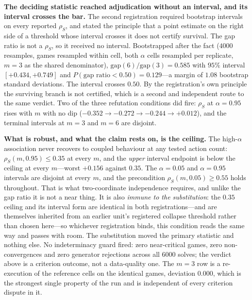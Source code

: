 \noindent\textbf{The deciding statistic reached adjudication without an interval, and its
interval crosses the bar.} The second registration required bootstrap intervals on every
reported $\rho_S$, and stated the principle that a point estimate on the right side of a
threshold whose interval crosses it does not certify survival. The gap ratio is not a
$\rho_S$, so it received no interval. Bootstrapped after the fact ($4000$ resamples,
games resampled within cell, both $\alpha$ cells resampled per replicate, $m=3$ as the
shared denominator), $\mathrm{gap}(6)/\mathrm{gap}(3)=0.585$ with $95\%$ interval
$[+0.434,+0.749]$ and $P(\text{gap ratio}<0.50)=0.129$---a
margin of $1.08$ bootstrap standard deviations. The interval crosses $0.50$. By the
registration's own principle the surviving branch is not certified, which is a second and
independent route to the same verdict. Two of the three refutation conditions did fire:
$\rho_S$ at $\alpha=0.95$ rises with $m$ with no dip
($-0.352\to-0.272\to-0.244\to+0.012$), and the terminal intervals at $m=3$ and $m=6$ are
disjoint.

\noindent\textbf{What is robust, and what the claim rests on, is the ceiling.} The
high-$\alpha$ association never recovers to coupled behaviour at any tested action count:
$\rho_S(m,0.95)\le0.35$ at every $m$, and the \emph{upper} interval endpoint is below the
ceiling at every $m$---worst $+0.156$ against $0.35$. The $\alpha=0.05$ and $\alpha=0.95$
intervals are disjoint at every $m$, and the precondition $\rho_S(m,0.05)\ge0.55$ holds
throughout. That is what two-coordinate independence requires, and unlike the gap ratio it
is not a near thing. It is also \emph{immune to the substitution}: the $0.35$ ceiling and its
interval form are identical in both registrations---and are themselves inherited from an
earlier unit's registered collapse threshold rather than chosen here---so whichever
registration binds, this condition reads the same way and passes with room. The substitution
moved the primary statistic and nothing else. No indeterminacy guard fired: zero near-critical games, zero
non-convergences and zero generator rejections across all $6000$ solves; the verdict above
is a criterion outcome, not a data-quality one. The $m=3$ row is a re-execution of the
reference cells on the identical games, deviation $0.000$, which is the strongest single
property of the run and is independent of every criterion dispute in it.

